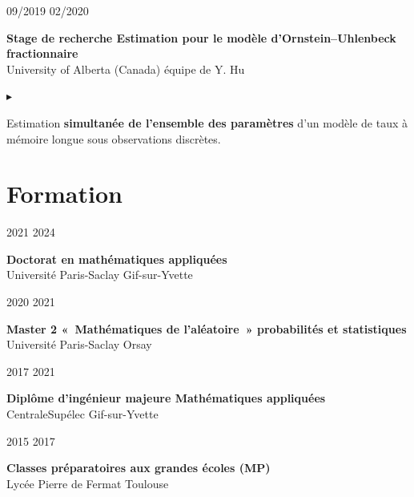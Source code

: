 \documentclass[10pt,a4paper]{article}
\newlength{\datecol}\setlength{\datecol}{0.165\textwidth}
\newlength{\gutter}\setlength{\gutter}{1em}
\newlength{\bodycol}
\newcommand{\entry}[3]{%
  \par\vspace{1.0ex plus 0.9ex minus 0.1ex}\noindent
  \begin{minipage}[t]{\datecol}
    \vspace{0pt}\raggedright\small\color{muted}#1
  \end{minipage}%
  \hspace{\gutter}%
  \begin{minipage}[t]{\bodycol}
    \vspace{0pt}\raggedright
    {\headingfont\bfseries\small #2}\\[0.15ex]
    {\small\color{accent}#3}
  \end{minipage}%
  \par\vspace{0.3ex}
}
\newenvironment{bullets}
  {\begin{list}{\textcolor{accent}{\scriptsize$\blacktriangleright$}}{%
      \setlength{\leftmargin}{\datecol}
      \addtolength{\leftmargin}{\gutter}
      \addtolength{\leftmargin}{1.25em}
      \setlength{\rightmargin}{0pt}
      \setlength{\labelwidth}{0.9em}
      \setlength{\labelsep}{0.35em}
      \setlength{\itemsep}{0.2ex}
      \setlength{\parsep}{0pt}
      \setlength{\topsep}{0.4ex}
      \setlength{\partopsep}{0pt}
      \small}}
  {\end{list}}
\begin{document}
\entry{09/2019 \textemdash{} 02/2020}{Stage de recherche \textemdash{} Estimation pour le modèle d'Ornstein--Uhlenbeck fractionnaire}{University of Alberta (Canada) \textemdash{} équipe de Y. Hu}
\begin{bullets}
  \item Estimation \textbf{simultanée de l'ensemble des paramètres} d'un modèle de taux à mémoire longue sous
  observations discrètes.
\end{bullets}

\section{Formation}

\entry{2021 \textemdash{} 2024}{Doctorat en mathématiques appliquées}{Université Paris-Saclay \textemdash{} Gif-sur-Yvette}

\entry{2020 \textemdash{} 2021}{Master 2 «~Mathématiques de l'aléatoire~» \textemdash{} probabilités et statistiques}{Université Paris-Saclay \textemdash{} Orsay}

\entry{2017 \textemdash{} 2021}{Diplôme d'ingénieur \textemdash{} majeure Mathématiques appliquées}{CentraleSupélec \textemdash{} Gif-sur-Yvette}

\entry{2015 \textemdash{} 2017}{Classes préparatoires aux grandes écoles (MP)}{Lycée Pierre de Fermat \textemdash{} Toulouse}

\end{document}
